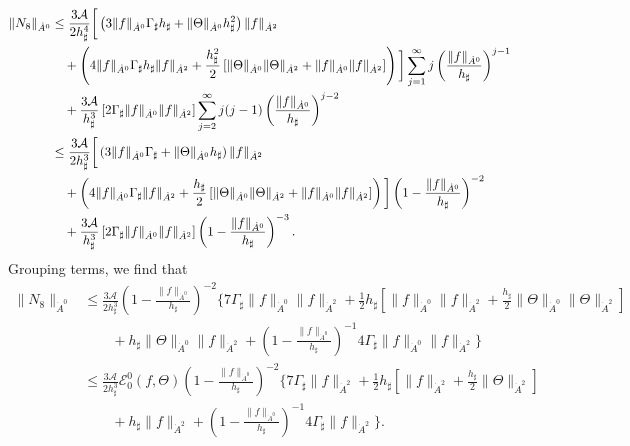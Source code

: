 \documentclass[reqno,11pt]{amsart}
\newcommand{\bh}{h_\sharp}
\newcommand{\bG}{\Gamma_\sharp}
\begin{document}
{\begin{align*}
\|N_8\|_{\dot A^0}&\leq \frac{3\mathcal{A}}{2\bh^4}\bigg{[}\left(3\|f\|_{\dot A^0}\bG\bh+\|\Theta\|_{\dot A^0} \bh^2\right)\|f\|_{\dot{A}^2}\\
&\quad+\left(4\|f\|_{\dot A^0}\bG\bh\|f\|_{\dot{A}^2}+\frac{\bh^2}{2}\left[\|\Theta\|_{\dot A^0}\|\Theta\|_{\dot{A}^2}+\|f\|_{\dot A^0}\|f\|_{\dot{A}^2}\right] \right)\bigg{]}\sum_{j=1}^\infty j\left(\frac{\|f\|_{\dot A^0}}{\bh}\right)^{j-1}\nonumber\\
&\quad+ \frac{3\mathcal{A}}{\bh^3}\left[2\bG\|f\|_{\dot A^0}\|f\|_{\dot{A}^2}\right]\sum_{j=2}^\infty j(j-1)\left(\frac{\|f\|_{\dot A^0}}{\bh}\right)^{j-2}\\
&\leq \frac{3\mathcal{A}}{2\bh^3}\bigg{[}\left(3\|f\|_{\dot A^0}\bG+\|\Theta\|_{\dot A^0} \bh\right)\|f\|_{\dot{A}^2}\\
&\quad+\left(4\|f\|_{\dot A^0}\bG\|f\|_{\dot{A}^2}+\frac{\bh}{2}\left[\|\Theta\|_{\dot A^0}\|\Theta\|_{\dot{A}^2}+\|f\|_{\dot A^0}\|f\|_{\dot{A}^2}\right] \right)\bigg{]}\left(1-\frac{\|f\|_{\dot A^0}}{\bh}\right)^{-2}\nonumber\\
&\quad+ \frac{3\mathcal{A}}{\bh^3}\left[2\bG\|f\|_{\dot A^0}\|f\|_{\dot{A}^2}\right]\left(1-\frac{\|f\|_{\dot A^0}}{\bh}\right)^{-3}.
\end{align*}
Grouping terms, we find that
\begin{align*}
\|N_8\|_{\dot A^0}&\leq \frac{3\mathcal{A}}{2\bh^3}\left(1-\frac{\|f\|_{\dot A^0}}{\bh}\right)^{-2}\Big\{7\bG\|f\|_{\dot A^0}\|f\|_{\dot A^2} + \frac{1}{2}\bh[\|f\|_{\dot A^0}\|f\|_{\dot A^2}+{\frac{\bh}{2}}\|\Theta\|_{\dot A^0}\|\Theta\|_{\dot A^2}] \\
  &\qquad + \bh \|\Theta\|_{\dot A^0}\|f\|_{\dot A^2}+ \left(1-\frac{\|f\|_{\dot A^0}}{\bh}\right)^{-1}4\bG\|f\|_{\dot A^0}\|f\|_{\dot A^2}\Big\}\\
&\leq \frac{3\mathcal{A}}{2\bh^3}\mathscr{E}_0^0(f,\Theta)\left(1-\frac{\|f\|_{\dot A^0}}{\bh}\right)^{-2}\Big\{7\bG\|f\|_{\dot A^2} + \frac{1}{2}\bh[\|f\|_{\dot A^2}+{\frac{\bh}{2}}\|\Theta\|_{\dot A^2}] \\
  &\qquad + \bh \|f\|_{\dot A^2}+ \left(1-\frac{\|f\|_{\dot A^0}}{\bh}\right)^{-1}4\bG\|f\|_{\dot A^2}\Big\}.
\end{align*}



}
\end{document}
